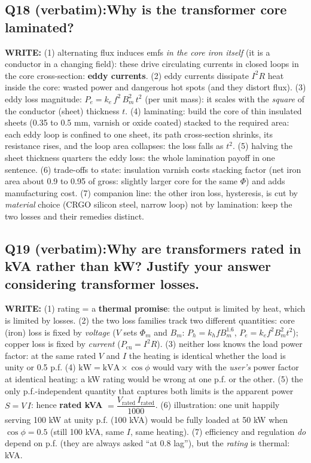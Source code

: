 \documentclass[11pt]{article}
\newcommand{\q}[2]{\subsection*{\color{copper}#1\quad\color{iron}#2}}
\newcommand{\w}[1]{\textbf{\color{copper}WRITE:} #1}
\begin{document}
\q{Q18 (verbatim):}{Why is the transformer core laminated?}
\w{(1) alternating flux induces emfs \emph{in the core iron itself} (it is a conductor in a changing field): these drive circulating currents in closed loops in the core cross-section: \textbf{eddy currents}. (2) eddy currents dissipate $I^{2}R$ heat inside the core: wasted power and dangerous hot spots (and they distort flux). (3) eddy loss magnitude: $P_e = k_e\, f^{2}\, B_m^{2}\, t^{2}$ (per unit mass): it scales with the \emph{square} of the conductor (sheet) thickness $t$. (4) laminating: build the core of thin insulated sheets (0.35 to 0.5 mm, varnish or oxide coated) stacked to the required area: each eddy loop is confined to one sheet, its path cross-section shrinks, its resistance rises, and the loop area collapses: the loss falls as $t^{2}$. (5) halving the sheet thickness quarters the eddy loss: the whole lamination payoff in one sentence. (6) trade-offs to state: insulation varnish costs stacking factor (net iron area about 0.9 to 0.95 of gross: slightly larger core for the same $\Phi$) and adds manufacturing cost. (7) companion line: the other iron loss, hysteresis, is cut by \emph{material} choice (CRGO silicon steel, narrow loop) not by lamination: keep the two losses and their remedies distinct.}

\q{Q19 (verbatim):}{Why are transformers rated in kVA rather than kW? Justify your answer considering transformer losses.}
\w{(1) rating = a \textbf{thermal promise}: the output is limited by heat, which is limited by losses. (2) the two loss families track two different quantities: core (iron) loss is fixed by \emph{voltage} ($V$ sets $\Phi_m$ and $B_m$: $P_h = k_h f B_m^{1.6}$, $P_e = k_e f^{2} B_m^{2} t^{2}$); copper loss is fixed by \emph{current} ($P_{\text{cu}} = I^{2}R$). (3) neither loss knows the load power factor: at the same rated $V$ and $I$ the heating is identical whether the load is unity or 0.5 p.f. (4) $\text{kW} = \text{kVA} \times \cos\phi$ would vary with the \emph{user's} power factor at identical heating: a kW rating would be wrong at one p.f. or the other. (5) the only p.f.-independent quantity that captures both limits is the apparent power $S = V\, I$: hence \textbf{rated kVA} $= \dfrac{V_{\text{rated}}\, I_{\text{rated}}}{1000}$. (6) illustration: one unit happily serving 100 kW at unity p.f. (100 kVA) would be fully loaded at 50 kW when $\cos\phi = 0.5$ (still 100 kVA, same $I$, same heating). (7) efficiency and regulation \emph{do} depend on p.f. (they are always asked ``at 0.8 lag''), but the \emph{rating} is thermal: kVA.}
\end{document}
